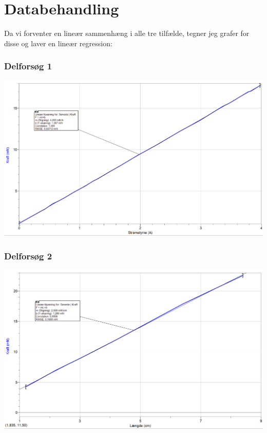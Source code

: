 \documentclass[10pt,a4paper]{article}
\theoremstyle{break}
\theoremstyle{nonumberplain}
\begin{document}
\section{Databehandling}
Da vi forventer en lineær sammenhæng i alle tre tilfælde, tegner jeg grafer for disse og laver en lineær regression:
\subsubsection{Delforsøg 1}
\begin{center}
\includegraphics[scale=0.5]{graf1}
\end{center}

\subsubsection{Delforsøg 2}
\begin{center}
\includegraphics[scale=0.5]{graf2}
\end{center}
\end{document}
